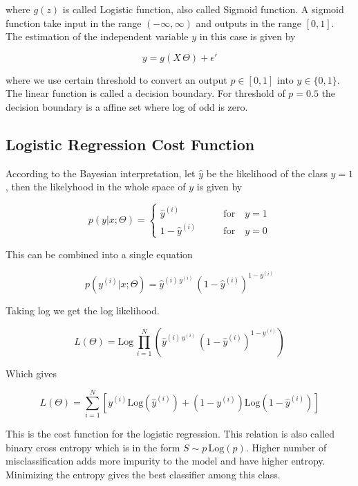 \documentclass[11pt]{article}
\theoremstyle{definition}
\begin{document}
where $g(z)$ is called Logistic function, also called Sigmoid function. A sigmoid function take input in the range $(-\infty, \infty)$ and outputs in the range $[0, 1]$. The estimation of the independent variable $y$ in this case is given by 

$$
y = g(X \, \Theta) + \epsilon'
$$

where we use certain threshold to convert an output $p \in [0, 1]$ into $y \in \{0, 1\}$. The linear function is called a decision boundary. For threshold of $p=0.5$ the decision boundary is a affine set where log of odd is zero. 



\subsection{Logistic Regression Cost Function}


According to the Bayesian interpretation, let $\hat{y}$ be the likelihood of the class $y=1$, then the likelyhood in the whole space of $y$ is given by 

\begin{equation*}
    p(y|x; \Theta) =
    \begin{cases} 
        \hat{y}^{(i)} & \qquad \text{for}\quad y = 1 \\
        1 -  \hat{y}^{(i)} & \qquad \text{for}\quad y = 0 
   \end{cases}
\end{equation*}

This can be combined into a single equation 


$$
p(y^{(i)}|x;\Theta) = \hat{y}^{(i)\, y^{(i)}} \, (1-\hat{y}^{(i)})^{1-y^{(i)}}
$$

Taking log we get the log likelihood. 

$$
L(\Theta) = \text{Log} \, \prod_{i=1}^N  \left( \hat{y}^{(i)\, y^{(i)}} \, (1-\hat{y}^{(i)})^{1-y^{(i)}} \right)
$$

Which gives 

$$
L(\Theta) = \sum_{i=1}^N \left[ y^{(i)} \text{Log} (\hat{y}^{(i)}) + (1-y^{(i)}) \text{Log}(1-\hat{y}^{(i)}) \right]
$$


This is the cost function for the logistic regression. This relation is also called binary cross entropy which is in the form $S \sim p \, \text{Log}(p)$. Higher number of misclassification adds more impurity to the model and have higher entropy. Minimizing the entropy gives the best classifier among this class. 
\end{document}
